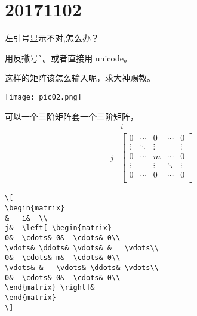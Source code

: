 \documentclass[QA.tex]{subfiles}
\begin{document}
%
%

\chapter{20171102}\label{ch1102}

\begin{qst}\label{Q2017110201}
左引号显示不对,怎么办？
\end{qst}
\ans 用反撇号\verb|`|。或者直接用 unicode。

\begin{qst}\label{Q2017110202}
这样的矩阵该怎么输入呢，求大神赐教。

\texttt{[image: pic02.png]}
\end{qst}
\ans 可以一个三阶矩阵套一个三阶矩阵，
\[
\begin{matrix}
&	i&	\\
j&	\left[ \begin{matrix}
0&	\cdots&	0&	\cdots&	0\\
\vdots&	\ddots&	\vdots&	&	\vdots\\
0&	\cdots&	m&	\cdots&	0\\
\vdots&	&	\vdots&	\ddots&	\vdots\\
0&	\cdots&	0&	\cdots&	0\\
\end{matrix} \right]&
\end{matrix}
\]
\begin{verbatim}
\[
\begin{matrix}
&	i&	\\
j&	\left[ \begin{matrix}
0&	\cdots&	0&	\cdots&	0\\
\vdots&	\ddots&	\vdots&	&	\vdots\\
0&	\cdots&	m&	\cdots&	0\\
\vdots&	&	\vdots&	\ddots&	\vdots\\
0&	\cdots&	0&	\cdots&	0\\
\end{matrix} \right]&
\end{matrix}
\]
\end{verbatim}
\end{document}

